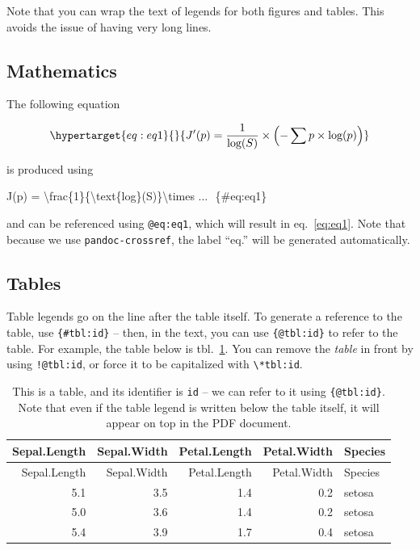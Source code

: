 \documentclass[11pt]{article}
\newenvironment{Shaded}{\begin{snugshade}}{\end{snugshade}}
\newcommand{\SpecialCharTok}[1]{\textcolor[rgb]{0.00,0.00,0.00}{#1}}
\newcommand{\SpecialStringTok}[1]{\textcolor[rgb]{0.31,0.60,0.02}{#1}}
\newcommand{\NormalTok}[1]{#1}
\begin{document}
Note that you can wrap the text of legends for both figures and tables.
This avoids the issue of having very long lines.

\hypertarget{mathematics}{%
\subsection{Mathematics}\label{mathematics}}

The following equation

\begin{equation}\protect\hypertarget{eq:eq1}{}{J'(p) = \frac{1}{\text{log}(S)}\times\left(-\sum p \times \text{log}(p)\right)}\label{eq:eq1}\end{equation}

is produced using

\begin{Shaded}
\begin{Highlighting}[]
\SpecialStringTok{$$J\textquotesingle{}(p) = }\SpecialCharTok{\textbackslash{}frac}\SpecialStringTok{\{1\}\{}\SpecialCharTok{\textbackslash{}text}\NormalTok{\{log\}}\SpecialStringTok{(S)\}}\SpecialCharTok{\textbackslash{}times}\SpecialStringTok{ ... $$}\NormalTok{ \{\#eq:eq1\}}
\end{Highlighting}
\end{Shaded}

and can be referenced using \texttt{@eq:eq1}, which will result in
eq.~\ref{eq:eq1}. Note that because we use \texttt{pandoc-crossref}, the
label ``eq.'' will be generated automatically.

\hypertarget{tables}{%
\subsection{Tables}\label{tables}}

Table legends go on the line after the table itself. To generate a
reference to the table, use \texttt{\{\#tbl:id\}} -- then, in the text,
you can use \texttt{\{@tbl:id\}} to refer to the table. For example, the
table below is tbl.~\ref{tbl:id}. You can remove the \emph{table} in
front by using \texttt{!@tbl:id}, or force it to be capitalized with
\texttt{\textbackslash{}*tbl:id}.

\hypertarget{tbl:id}{}
\begin{longtable}[]{@{}rrrrl@{}}
\caption{\label{tbl:id}This is a table, and its identifier is
\texttt{id} -- we can refer to it using \texttt{\{@tbl:id\}}. Note that
even if the table legend is written below the table itself, it will
appear on top in the PDF document.}\tabularnewline
\toprule
Sepal.Length & Sepal.Width & Petal.Length & Petal.Width &
Species\tabularnewline
\midrule
\endfirsthead
\toprule
Sepal.Length & Sepal.Width & Petal.Length & Petal.Width &
Species\tabularnewline
\midrule
\endhead
5.1 & 3.5 & 1.4 & 0.2 & setosa\tabularnewline
5.0 & 3.6 & 1.4 & 0.2 & setosa\tabularnewline
5.4 & 3.9 & 1.7 & 0.4 & setosa\tabularnewline
\bottomrule
\end{longtable}
\end{document}
